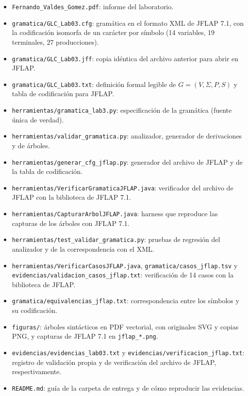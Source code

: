\documentclass[11pt,letterpaper]{article}
\begin{document}
\begin{itemize}
  \item \texttt{Fernando\_Valdes\_Gomez.pdf}: informe del laboratorio.
  \item \texttt{gramatica/\allowbreak GLC\_Lab03.cfg}: gramática en el formato XML de JFLAP 7.1, con
  la codificación isomorfa de un carácter por símbolo (14 variables, 19 terminales, 27 producciones).
  \item \texttt{gramatica/\allowbreak GLC\_Lab03.jff}: copia idéntica del archivo anterior para abrir en JFLAP.
  \item \texttt{gramatica/\allowbreak GLC\_Lab03.txt}: definición formal legible de $G=(V,\Sigma,P,S)$
  y tabla de codificación para JFLAP.
  \item \texttt{herramientas/\allowbreak gramatica\_lab3.py}: especificación de la gramática (fuente única de
  verdad).
  \item \texttt{herramientas/\allowbreak validar\_gramatica.py}: analizador, generador de derivaciones y de
  árboles.
  \item \texttt{herramientas/\allowbreak generar\_cfg\_jflap.py}: generador del archivo de JFLAP y de
  la tabla de codificación.
  \item \texttt{herramientas/\allowbreak VerificarGramaticaJFLAP.\allowbreak java}: verificador del archivo de JFLAP con
  la biblioteca de JFLAP 7.1.
  \item \texttt{herramientas/\allowbreak CapturarArbolJFLAP.\allowbreak java}: harness que reproduce las capturas de los
  árboles con JFLAP 7.1.
  \item \texttt{herramientas/\allowbreak test\_validar\_gramatica.py}: pruebas de regresión del analizador y de la correspondencia con el XML.
  \item \texttt{herramientas/\allowbreak VerificarCasosJFLAP.java},
  \texttt{gramatica/\allowbreak casos\_jflap.tsv} y
  \texttt{evidencias/\allowbreak validacion\_casos\_jflap.txt}: verificación de 14 casos con la biblioteca de JFLAP.
  \item \texttt{gramatica/\allowbreak equivalencias\_jflap.txt}: correspondencia entre los símbolos y su codificación.
  \item \texttt{figuras/}: árboles sintácticos en PDF vectorial, con originales SVG y copias PNG, y
  capturas de JFLAP 7.1 en \texttt{jflap\_*.png}.
  \item \texttt{evidencias/\allowbreak evidencias\_lab03.txt} y \texttt{evidencias/\allowbreak verificacion\_jflap.txt}:
  registro de validación propia y de verificación del archivo de JFLAP, respectivamente.
  \item \texttt{README.md}: guía de la carpeta de entrega y de cómo reproducir las evidencias.
\end{itemize}
\end{document}
